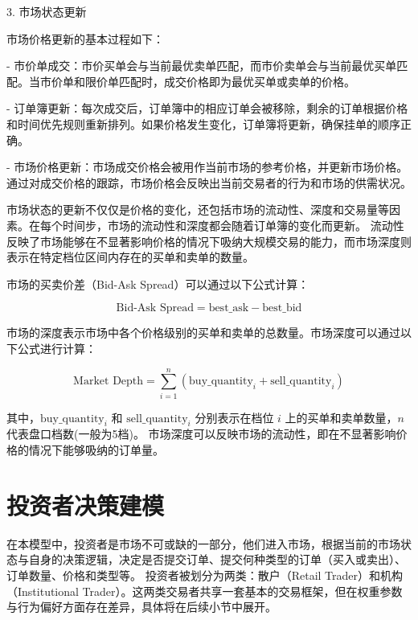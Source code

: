 3. 市场状态更新

市场价格更新的基本过程如下：

- 市价单成交：市价买单会与当前最优卖单匹配，而市价卖单会与当前最优买单匹配。当市价单和限价单匹配时，成交价格即为最优买单或卖单的价格。
   
- 订单簿更新：每次成交后，订单簿中的相应订单会被移除，剩余的订单根据价格和时间优先规则重新排列。如果价格发生变化，订单簿将更新，确保挂单的顺序正确。

- 市场价格更新：市场成交价格会被用作当前市场的参考价格，并更新市场价格。通过对成交价格的跟踪，市场价格会反映出当前交易者的行为和市场的供需状况。

市场状态的更新不仅仅是价格的变化，还包括市场的流动性、深度和交易量等因素。在每个时间步，市场的流动性和深度都会随着订单簿的变化而更新。
流动性反映了市场能够在不显著影响价格的情况下吸纳大规模交易的能力，而市场深度则表示在特定档位区间内存在的买单和卖单的数量。

市场的买卖价差（Bid-Ask Spread）可以通过以下公式计算：

\begin{equation}
    \text{Bid-Ask Spread} = \text{best\_ask} - \text{best\_bid}
\end{equation}

市场的深度表示市场中各个价格级别的买单和卖单的总数量。市场深度可以通过以下公式进行计算：

\begin{equation}
    \text{Market Depth} = \sum_{i=1}^{n} (\text{buy\_quantity}_i + \text{sell\_quantity}_i)
\end{equation}

其中，\( \text{buy\_quantity}_i \) 和 \( \text{sell\_quantity}_i \) 分别表示在档位 \( i \) 上的买单和卖单数量，\( n \)代表盘口档数(一般为5档)。
市场深度可以反映市场的流动性，即在不显著影响价格的情况下能够吸纳的订单量。





\section{投资者决策建模}


在本模型中，投资者是市场不可或缺的一部分，他们进入市场，根据当前的市场状态与自身的决策逻辑，决定是否提交订单、提交何种类型的订单（买入或卖出）、订单数量、价格和类型等。
投资者被划分为两类：散户（Retail Trader）和机构（Institutional Trader）。这两类交易者共享一套基本的交易框架，但在权重参数与行为偏好方面存在差异，具体将在后续小节中展开。

